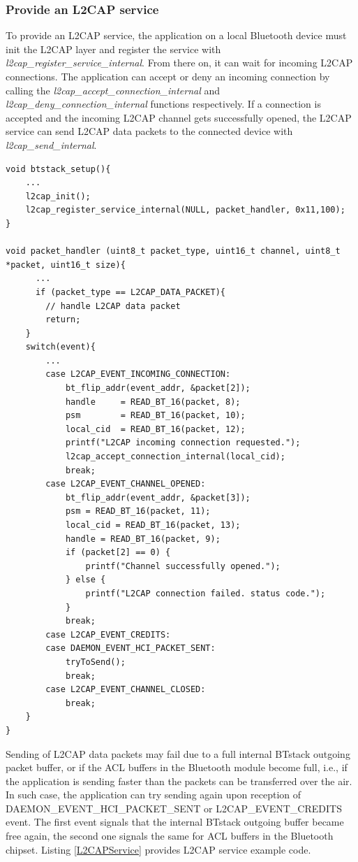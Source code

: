 \subsubsection{Provide an L2CAP service}

To provide an L2CAP service, the application on a local Bluetooth device must init the L2CAP layer and register the service with \emph{l2cap\_register\_service\_internal}. From there on, it can wait for incoming L2CAP connections. The application can accept or deny an incoming connection by calling the \emph{l2cap\_accept\_connection\_internal} and \emph{l2cap\_deny\_connection\_internal} functions respectively. If a connection is accepted and the incoming L2CAP channel gets successfully opened, the L2CAP service can send L2CAP data packets to the connected device with \emph{l2cap\_send\_internal}. 

\begin{lstlisting}[caption=Providing an L2CAP service., label=L2CAPService]
void btstack_setup(){
    ...
    l2cap_init();
    l2cap_register_service_internal(NULL, packet_handler, 0x11,100);
}

void packet_handler (uint8_t packet_type, uint16_t channel, uint8_t *packet, uint16_t size){
      ...
      if (packet_type == L2CAP_DATA_PACKET){
        // handle L2CAP data packet
        return;
    }
    switch(event){
        ...
        case L2CAP_EVENT_INCOMING_CONNECTION:
            bt_flip_addr(event_addr, &packet[2]);
            handle     = READ_BT_16(packet, 8); 
            psm        = READ_BT_16(packet, 10); 
            local_cid  = READ_BT_16(packet, 12); 
            printf("L2CAP incoming connection requested.");
            l2cap_accept_connection_internal(local_cid);
            break;
        case L2CAP_EVENT_CHANNEL_OPENED:
            bt_flip_addr(event_addr, &packet[3]);
            psm = READ_BT_16(packet, 11); 
            local_cid = READ_BT_16(packet, 13); 
            handle = READ_BT_16(packet, 9);
            if (packet[2] == 0) {
                printf("Channel successfully opened.");
            } else {
                printf("L2CAP connection failed. status code.");
            }
            break;        
        case L2CAP_EVENT_CREDITS:
        case DAEMON_EVENT_HCI_PACKET_SENT:
            tryToSend();
            break;
        case L2CAP_EVENT_CHANNEL_CLOSED:
            break;
    }
}
\end{lstlisting}

Sending of L2CAP data packets may fail due to a full internal BTstack outgoing packet buffer, or if the ACL buffers in the Bluetooth module become full, i.e., if the application is sending faster than the packets can be transferred over the air. In such case, the application can try sending again upon reception of DAEMON\_EVENT\_HCI\_PACKET\_SENT or L2CAP\_EVENT\_CREDITS event. The first event signals that the internal BTstack outgoing buffer became free again, the second one signals the same for ACL buffers in the Bluetooth chipset. Listing \ref{L2CAPService} provides L2CAP service example code.

